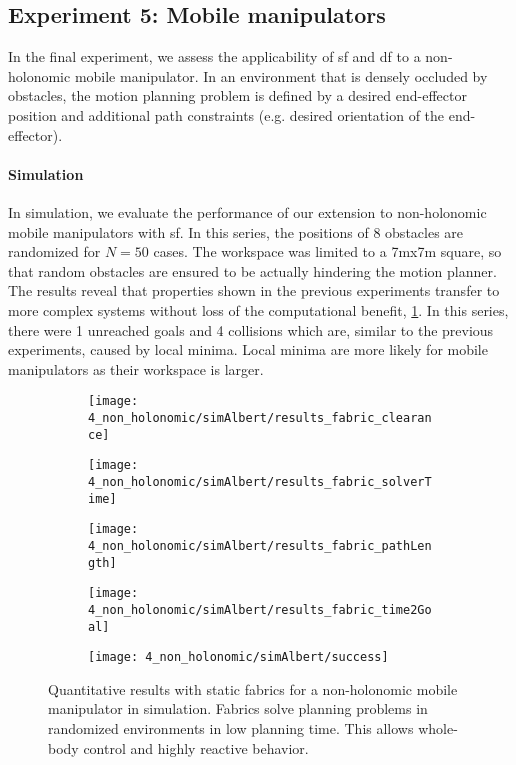 \subsection{Experiment 5: Mobile manipulators}%
\label{sub:experiment_5_mobile_manipulators}

In the final experiment, we assess the applicability of \ac{sf} and \ac{df} to a 
non\hyp{}holonomic mobile manipulator. In an environment that is densely occluded by obstacles,
the motion planning problem is defined by a desired end-effector position and additional
path constraints (e.g. desired orientation of the end-effector).
\paragraph{Simulation}
In simulation, we evaluate the performance of our extension to non\hyp{}holonomic
mobile manipulators with \ac{sf}. In this series, the positions of 8 obstacles
are randomized for $N=50$ cases. The workspace was limited to a
7mx7m square, so that random obstacles are ensured to be actually hindering the
motion planner. The results reveal that properties shown in the previous
experiments transfer to more complex systems without loss of the computational
benefit, \cref{fig:experiment5_simAlbert_results}. In this series, there were
1 unreached goals and 4 collisions which are, similar
to the previous experiments, caused by local minima. Local minima are more
likely for mobile manipulators as their workspace is larger.
%
\begin{figure}[ht]
  \centering
  \begin{subfigure}{1.0\linewidth}
    \centering
    \texttt{[image: 4\_non\_holonomic/simAlbert/results\_fabric\_clearance]}
  \end{subfigure}
  \begin{subfigure}{1.0\linewidth}
    \centering
    \texttt{[image: 4\_non\_holonomic/simAlbert/results\_fabric\_solverTime]}
  \end{subfigure}
  \begin{subfigure}{1.0\linewidth}
    \centering
    \texttt{[image: 4\_non\_holonomic/simAlbert/results\_fabric\_pathLength]}
  \end{subfigure}
  \begin{subfigure}{1.0\linewidth}
    \centering
    \texttt{[image: 4\_non\_holonomic/simAlbert/results\_fabric\_time2Goal]}
  \end{subfigure}
  \begin{subfigure}{1.0\linewidth}
    \centering
    \texttt{[image: 4\_non\_holonomic/simAlbert/success]}
  \end{subfigure}
  \caption{Quantitative results with static fabrics for a 
    non\hyp{}holonomic mobile manipulator in simulation. Fabrics solve planning problems in
    randomized environments in low planning time. This allows whole-body control and highly
    reactive behavior.
  }%
  \label{fig:experiment5_simAlbert_results}
\end{figure}
